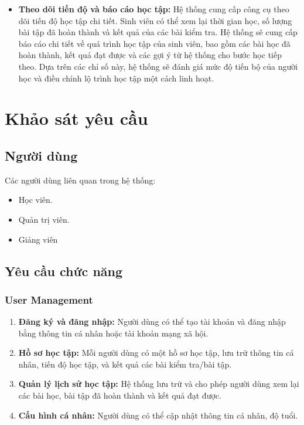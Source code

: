 \begin{itemize}
    \item \textbf{Theo dõi tiến độ và báo cáo học tập:} Hệ thống cung cấp công cụ theo dõi tiến độ học tập chi tiết. Sinh viên có thể xem lại thời gian học, số lượng bài tập đã hoàn thành và kết quả của các bài kiểm tra. Hệ thống sẽ cung cấp báo cáo chi tiết về quá trình học tập của sinh viên, bao gồm các bài học đã hoàn thành, kết quả đạt được và các gợi ý từ hệ thống cho bước học tiếp theo. Dựa trên các chỉ số này, hệ thống sẽ đánh giá mức độ tiến bộ của người học và điều chỉnh lộ trình học tập một cách linh hoạt.
\end{itemize}

\section{Khảo sát yêu cầu}
\subsection{Người dùng}
Các người dùng liên quan trong hệ thống:  
\begin{itemize}
    \item Học viên.
    \item Quản trị viên.
    \item Giảng viên
\end{itemize}
\subsection{Yêu cầu chức năng}
\subsubsection{User Management}
\begin{enumerate}
    \item \textbf{Đăng ký và đăng nhập:} Người dùng có thể tạo tài khoản và đăng nhập bằng thông tin cá nhân hoặc tài khoản mạng xã hội.
\item \textbf{Hồ sơ học tập:} Mỗi người dùng có một hồ sơ học tập, lưu trữ thông tin cá nhân, tiến độ học tập, và kết quả các bài kiểm tra/bài tập.
\item \textbf{Quản lý lịch sử học tập:} Hệ thống lưu trữ và cho phép người dùng xem lại các bài học, bài tập đã hoàn thành và kết quả đạt được.
\item \textbf{Cấu hình cá nhân:} Người dùng có thể cập nhật thông tin cá nhân, độ tuổi.
\end{enumerate}
